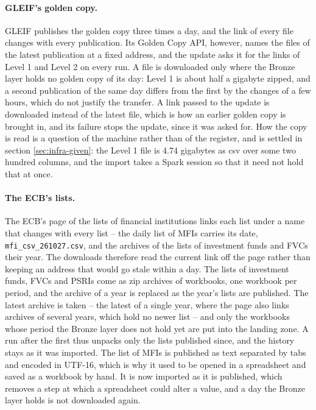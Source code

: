 \paragraph{GLEIF's golden copy.} GLEIF publishes the golden copy three times a day, and the link of every file changes with every publication. Its Golden Copy API, however, names the files of the latest publication at a fixed address, and the update asks it for the links of Level 1 and Level 2 on every run. A file is downloaded only where the Bronze layer holds no golden copy of its day: Level 1 is about half a gigabyte zipped, and a second publication of the same day differs from the first by the changes of a few hours, which do not justify the transfer. A link passed to the update is downloaded instead of the latest file, which is how an earlier golden copy is brought in, and its failure stops the update, since it was asked for. How the copy is read is a question of the machine rather than of the register, and is settled in section \ref{sec:infra-given}: the Level 1 file is 4.74 gigabytes as csv over some two hundred columns, and the import takes a Spark session so that it need not hold that at once.

\paragraph{The ECB's lists.} The ECB's page of the lists of financial institutions links each list under a name that changes with every list -- the daily list of MFIs carries its date, \verb|mfi_csv_261027.csv|, and the archives of the lists of investment funds and FVCs their year. The downloads therefore read the current link off the page rather than keeping an address that would go stale within a day. The lists of investment funds, FVCs and PSRIs come as zip archives of workbooks, one workbook per period, and the archive of a year is replaced as the year's lists are published. The latest archive is taken -- the latest of a single year, where the page also links archives of several years, which hold no newer list -- and only the workbooks whose period the Bronze layer does not hold yet are put into the landing zone. A run after the first thus unpacks only the lists published since, and the history stays as it was imported. The list of MFIs is published as text separated by tabs and encoded in UTF-16, which is why it used to be opened in a spreadsheet and saved as a workbook by hand. It is now imported as it is published, which removes a step at which a spreadsheet could alter a value, and a day the Bronze layer holds is not downloaded again.

